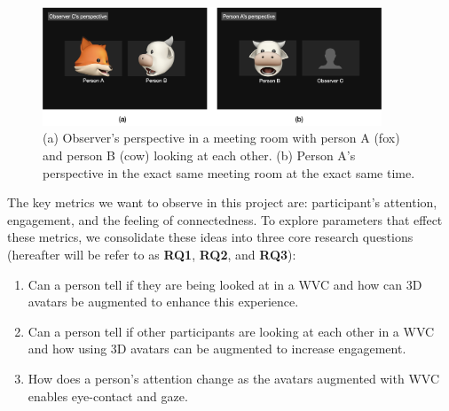 \begin{figure}
	\centering
 	\includegraphics[width=0.9\textwidth]{introB.png}
	\caption{(a) Observer’s perspective in a meeting room with person A (fox) and person B (cow) looking at each other. (b) Person A’s perspective in the exact same meeting room at the exact same time.}
	\label{fig:intro-b}
\end{figure}

The key metrics we want to observe in this project are: participant’s attention, engagement, and the feeling of connectedness. To explore parameters that effect these metrics, we consolidate these ideas into three core research questions (hereafter will be refer to as \textbf{RQ1}, \textbf{RQ2}, and \textbf{RQ3}):

\begin{enumerate}
    \item Can a person tell if they are being looked at in a WVC and how can 3D avatars be augmented to enhance this experience.
    \item Can a person tell if other participants are looking at each other in a WVC and how using 3D avatars can be augmented to increase engagement.
    \item How does a person’s attention change as the avatars augmented with WVC enables eye-contact and gaze.
\end{enumerate}

